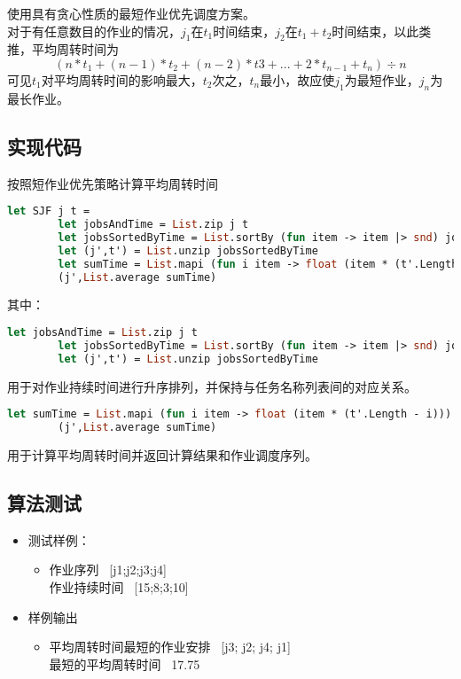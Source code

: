 \documentclass[a4paper]{article}
\begin{document}
使用具有贪心性质的最短作业优先调度方案。\\
对于有任意数目的作业的情况，\(j_1\)在\(t_1\)时间结束，\(j_2\)在\(t_1+t_2\)时间结束，以此类推，平均周转时间为 \[(n*t_1+(n-1)*t_2+(n-2)*t3+...+2*t_{n-1}+t_n) \div n\]
可见\(t_1\)对平均周转时间的影响最大，\(t_2\)次之，\(t_n\)最小，故应使\(j_1\)为最短作业，\(j_n\)为最长作业。
\subsection{实现代码}

按照短作业优先策略计算平均周转时间

\begin{lstlisting}[language=ML]
    let SJF j t =
        let jobsAndTime = List.zip j t
        let jobsSortedByTime = List.sortBy (fun item -> item |> snd) jobsAndTime
        let (j',t') = List.unzip jobsSortedByTime
        let sumTime = List.mapi (fun i item -> float (item * (t'.Length - i))) t'
        (j',List.average sumTime)
\end{lstlisting}

其中：\\

\begin{lstlisting}[language=ML]
        let jobsAndTime = List.zip j t
        let jobsSortedByTime = List.sortBy (fun item -> item |> snd) jobsAndTime
        let (j',t') = List.unzip jobsSortedByTime
\end{lstlisting}
用于对作业持续时间进行升序排列，并保持与任务名称列表间的对应关系。

\begin{lstlisting}[language=ML]
        let sumTime = List.mapi (fun i item -> float (item * (t'.Length - i))) t'
        (j',List.average sumTime)
\end{lstlisting}

用于计算平均周转时间并返回计算结果和作业调度序列。

\subsection{算法测试}

\begin{itemize}
\item
    测试样例：
    \begin{itemize}
    \item
        作业序列 \ [j1;j2;j3;j4] \\
        作业持续时间 \ [15;8;3;10]
    \end{itemize}
\item
    样例输出
    \begin{itemize}
    \item
        平均周转时间最短的作业安排 \ [j3; j2; j4; j1] \\
        最短的平均周转时间 \ 17.75
    \end{itemize}
\end{itemize}
\end{document}
